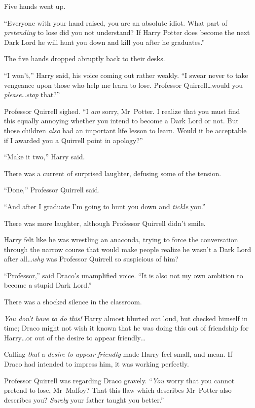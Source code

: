 Five hands went up.

“Everyone with your hand raised, you are an absolute idiot. What part of \emph{pretending} to lose did you not understand? If Harry Potter does become the next Dark Lord he will hunt you down and kill you after he graduates.”

The five hands dropped abruptly back to their desks.

“I won’t,” Harry said, his voice coming out rather weakly. “I swear never to take vengeance upon those who help me learn to lose. Professor Quirrell…would you \emph{please}…\emph{stop} that?”

Professor Quirrell sighed. “I \emph{am} sorry, Mr~Potter. I realize that you must find this equally annoying whether you intend to become a Dark Lord or not. But those children \emph{also} had an important life lesson to learn. Would it be acceptable if I awarded you a Quirrell point in apology?”

“Make it two,” Harry said.

There was a current of surprised laughter, defusing some of the tension.

“Done,” Professor Quirrell said.

“And after I graduate I’m going to hunt you down and \emph{tickle} you.”

There was more laughter, although Professor Quirrell didn’t smile.

Harry felt like he was wrestling an anaconda, trying to force the conversation through the narrow course that would make people realize he wasn’t a Dark Lord after all…\emph{why} was Professor Quirrell so suspicious of him?

“Professor,” said Draco’s unamplified voice. “It is also not my own ambition to become a stupid Dark Lord.”

There was a shocked silence in the classroom.

\emph{You don’t have to do this!} Harry almost blurted out loud, but checked himself in time; Draco might not wish it known that he was doing this out of friendship for Harry…or out of the desire to appear friendly…

Calling \emph{that} a \emph{desire to appear friendly} made Harry feel small, and mean. If Draco had intended to impress him, it was working perfectly.

Professor Quirrell was regarding Draco gravely. “\emph{You} worry that you cannot pretend to lose, Mr~Malfoy? That this flaw which describes Mr~Potter also describes you? \emph{Surely} your father taught you better.”

